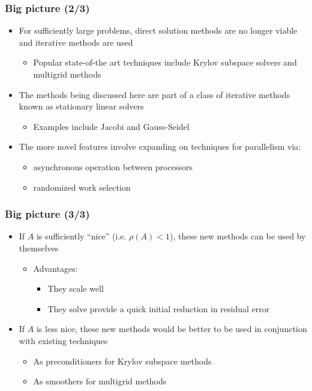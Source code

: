\documentclass{beamer}
\begin{document}
\begin{frame}
	\frametitle{Big picture (2/3)}
	\begin{itemize}
		\item For sufficiently large problems, direct solution methods are no longer viable and iterative methods are used
			\begin{itemize}
				\item Popular state-of-the art techniques include Krylov subspace solvers and multigrid methods 
			\end{itemize}
		\item The methods being discussed here are part of a class of iterative methods known as stationary linear solvers
			\begin{itemize}
				\item Examples include Jacobi and Gauss-Seidel
			\end{itemize}
		\item The more novel features involve expanding on techniques for parallelism via:
			\begin{itemize}
				\item asynchronous operation between processors
				\item randomized work selection
			\end{itemize} 
	\end{itemize}	
\end{frame}

\begin{frame}
	\frametitle{Big picture (3/3)}
	\begin{itemize}
		\item If $A$ is sufficiently ``nice'' (i.e. $\rho(A) < 1$), these new methods can be used by themselves
			\begin{itemize}
				\item Advantages:
					\begin{itemize}
						\item They scale well
						\item They solve provide a quick initial reduction in residual error
					\end{itemize}
			\end{itemize} 
		\item If $A$ is less nice, these new methods would be better to be used in conjunction with existing techniques
			\begin{itemize}
				\item As preconditioners for Krylov subspace methods
				\item As smoothers for multigrid methods
			\end{itemize}
	\end{itemize}	
\end{frame}
\end{document}
